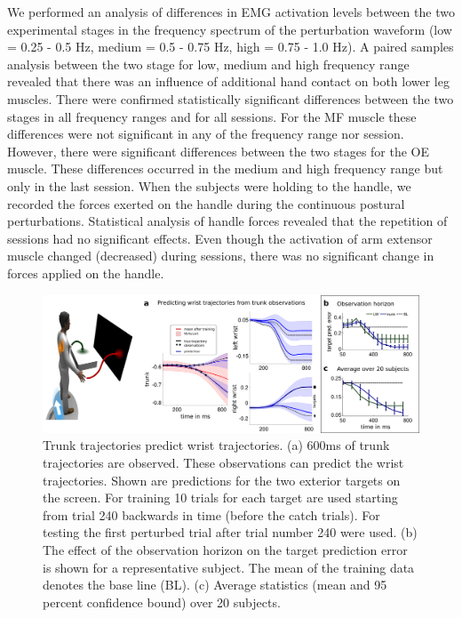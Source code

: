 \documentclass[final,5p,twocolumn]{elsarticle}
\begin{document}
We performed an analysis of differences in EMG activation levels between the two experimental stages in the frequency spectrum of the perturbation waveform (low = 0.25 - 0.5 Hz, medium = 0.5 - 0.75 Hz, high = 0.75 - 1.0 Hz). A paired samples analysis between the two stage for low, medium and high frequency range revealed that there was an influence of additional hand contact on both lower leg muscles. There were confirmed statistically significant differences between the two stages in all frequency ranges and for all sessions. For the MF muscle these differences were not significant in any of the frequency range nor session. However, there were significant differences between the two stages for the OE muscle. These differences occurred in the medium and high frequency range but only in the last session. When the subjects were holding to the handle, we recorded the forces exerted on the handle during the continuous postural perturbations. Statistical analysis of handle forces revealed that the repetition of sessions had no significant effects. Even though the activation of arm extensor muscle changed (decreased) during sessions, there was no significant change in forces applied on the handle.\\


\begin{figure}
\centering
\includegraphics[width=\linewidth]{images/SummaryFig_Y2Report.png}
\caption{Trunk trajectories predict wrist trajectories. (a) 600ms of trunk trajectories are observed. These observations can predict the wrist trajectories. Shown are predictions for the two exterior targets on the screen. For training 10 trials for each target are used starting from trial 240 backwards in time (before the catch trials). For testing the first perturbed trial after trial number 240 were used. (b) The effect of the observation horizon on the target prediction error is shown for a representative subject. The mean of the training data denotes the base line (BL). (c) Average statistics (mean and 95 percent confidence bound) over 20 subjects.
}
\label{fig:HumanProMPsPrediction}
\end{figure}
\end{document}
